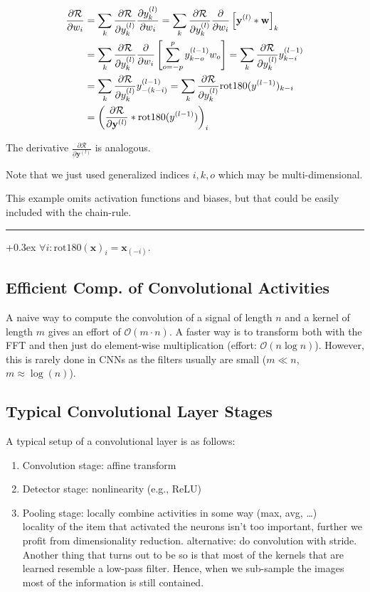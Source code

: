 \documentclass[a2paper,8pt]{extarticle}
\newcommand{\BigO}{\mathcal{O}}
\newcommand{\cR}{\mathcal{R}}
\newcommand{\conv}{\ensuremath *}
\renewcommand{\vec}[1]{\mathbf{#1}}
\newcommand{\vw}{\vec{w}}
\newcommand{\vx}{\vec{x}}
\newcommand{\vy}{\vec{y}}
\newcommand{\customboxpaddingsize}{0pt}
\newcommand{\emptyarg}[1][]{\ifthenelse{\isempty{#1}}{}{\ (#1)}}
\newcommand{\Def}[1][]{{\setlength\fboxsep{\customboxpaddingsize}
\colorbox{defcolor}{%
\color{custtitlecolor}{\textbf{D.\emptyarg[#1]}}}\kern+0.3ex}}
\newcommand{\sep}{\vspace{0pt}\noindent\hrule\vspace{0pt}}
\newcommand{\sep}{\vspace{5pt}\noindent\hrule\vspace{5pt}}
\begin{document}
\begin{landscape}
\begin{multicols*}{7}
\begin{align*}
\frac{\partial\cR}{\partial w_i}
&=\sum_{k}\frac{\partial\cR}{\partial y^{(l)}_k}\frac{\partial
y^{(l)}_k}{\partial w_i}
=\sum_{k}\frac{\partial\cR}{\partial y^{(l)}_k}\frac{\partial}{\partial w_i}
\left[\vy^{(l)}\conv\vw\right]_k
\\
&=\sum_{k}\frac{\partial\cR}{\partial y^{(l)}_k}\frac{\partial}{\partial w_i}
\left[\sum_{o=-p}^{p} y^{(l-1)}_{k-o}w_o\right]
=\sum_{k}\frac{\partial\cR}{\partial y^{(l)}_k}
y^{(l-1)}_{k-i}
\\
&=\sum_{k}\frac{\partial\cR}{\partial y^{(l)}_k}
y^{(l-1)}_{-(k-i)}
=\sum_{k}\frac{\partial\cR}{\partial y^{(l)}_k}
\text{rot180}(y^{(l-1)})_{k-i}
\\
&=\left(\frac{\partial\cR}{\partial \vy^{(l)}}
\conv\text{rot180}(y^{(l-1)})\right)_i
\end{align*}

The derivative $\frac{\partial\cR}{\partial\vy^{(l)}}$ is analogous.

Note that we just used generalized indices $i,k,o$ which may be
multi-dimensional.

This example omits activation functions and biases, but that could be easily
included with the chain-rule.

\sep

\Def[Rotation180] $\forall i\colon\text{rot180}(\vx)_i=\vx_{(-i)}.$

\subsection{Efficient Comp. of Convolutional Activities}

A naive way to compute the convolution of a signal of length $n$ and a kernel of
length $m$ gives an effort of $\BigO(m\cdot n)$. A faster way is to transform
both with the FFT and then just do element-wise multiplication (effort:
$\BigO(n\log n)$). However, this is rarely done in CNNs as the filters usually
are small ($m\ll n$, $m\approx \log(n)$).

\subsection{Typical Convolutional Layer Stages}

A typical setup of a convolutional layer is as follows:

\begin{enumerate}
  \item Convolution stage: affine transform
  \item Detector stage: nonlinearity (e.g., ReLU)
  \item Pooling stage: locally combine activities in some way (max, avg,
  \ldots)\\
  locality of the item that activated the neurons isn't too important, further
  we profit from dimensionality reduction. alternative: do convolution with
  stride. Another thing that turns out to be so is that most of the kernels that are
learned resemble a low-pass filter. Hence, when we sub-sample the images most of
the information is still contained.
\end{enumerate}


\end{multicols*}
\end{landscape}
\end{document}
